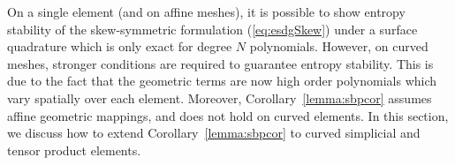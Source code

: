 \documentclass{svjour3}                     %
\newcommand{\diag}[1]{{\rm diag}\LRp{#1}}
\newcommand{\pd}[2]{\frac{\partial#1}{\partial#2}}
\newcommand{\LRp}[1]{\left( #1 \right)}
\newcommand{\LRs}[1]{\left[ #1 \right]}
\renewcommand{\note}[1]{{\color{blue}{#1}}}
\begin{document}
%
%
%


On a single element (and on affine meshes), it is possible to show entropy stability of the skew-symmetric formulation (\ref{eq:esdgSkew}) under a surface quadrature which is only exact for degree $N$ polynomials.  However, on curved meshes, stronger conditions are required to guarantee entropy stability.  This is due to the fact that the geometric terms are now high order polynomials which vary spatially over each element.  Moreover, Corollary~\ref{lemma:sbpcor} assumes affine geometric mappings, and does not hold on curved elements.  In this section, we discuss how to extend Corollary~\ref{lemma:sbpcor} to curved simplicial and tensor product elements.  
\end{document}
